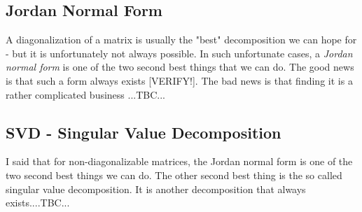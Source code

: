 


\subsection{Jordan Normal Form}
A diagonalization of a matrix is usually the "best" decomposition we can hope for - but it is unfortunately not always possible. In such unfortunate cases, a \emph{Jordan normal form} is one of the two second best things that we can do. The good news is that such a form always exists [VERIFY!]. The bad news is that finding it is a rather complicated business ...TBC...









\subsection{SVD - Singular Value Decomposition}

I said that for non-diagonalizable matrices, the Jordan normal form is one of the two second best things we can do. The other second best thing is the so called singular value decomposition. It is another decomposition that always exists....TBC...


